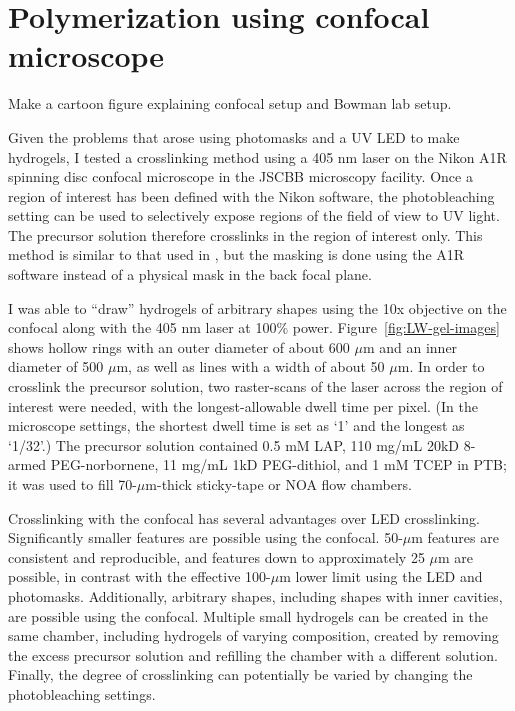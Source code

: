 \section{Polymerization using confocal microscope}
\label{sec:confocal-crosslinking}
 Make a cartoon figure explaining confocal setup and Bowman lab setup.

Given the problems that arose using photomasks and a UV LED to make hydrogels, I tested a crosslinking method using a 405 nm laser on the Nikon A1R spinning disc confocal microscope in the JSCBB microscopy facility.  Once a region of interest has been defined with the Nikon software, the photobleaching setting can be used to selectively expose regions of the field of view to UV light.  The precursor solution therefore crosslinks in the region of interest only.  This method is similar to that used in \cite{paustian13}, but the masking is done using the A1R software instead of a physical mask in the back focal plane.

I was able to ``draw'' hydrogels of arbitrary shapes using the 10x objective on the confocal along with the 405 nm laser at 100\% power.  Figure~\ref{fig:LW-gel-images} shows hollow rings with an outer diameter of about 600 $\mu$m and an inner diameter of 500 $\mu$m, as well as lines with a width of about 50 $\mu$m.  In order to crosslink the precursor solution, two raster-scans of the laser across the region of interest were needed, with the longest-allowable dwell time per pixel.  (In the microscope settings, the shortest dwell time is set as `1' and the longest as `1/32'.)  The precursor solution contained 0.5 mM LAP, 110 mg/mL 20kD 8-armed PEG-norbornene, 11 mg/mL 1kD PEG-dithiol, and 1 mM TCEP in PTB; it was used to fill 70-$\mu$m-thick sticky-tape or NOA flow chambers.


Crosslinking with the confocal has several advantages over LED crosslinking.  Significantly smaller features are possible using the confocal.  50-$\mu$m features are consistent and reproducible, and features down to approximately 25 $\mu$m are possible, in contrast with the effective 100-$\mu$m lower limit using the LED and photomasks.  Additionally, arbitrary shapes, including shapes with inner cavities, are possible using the confocal.  Multiple small hydrogels can be created in the same chamber, including hydrogels of varying composition, created by removing the excess precursor solution and refilling the chamber with a different solution.  Finally, the degree of crosslinking can potentially be varied by changing the photobleaching settings.

